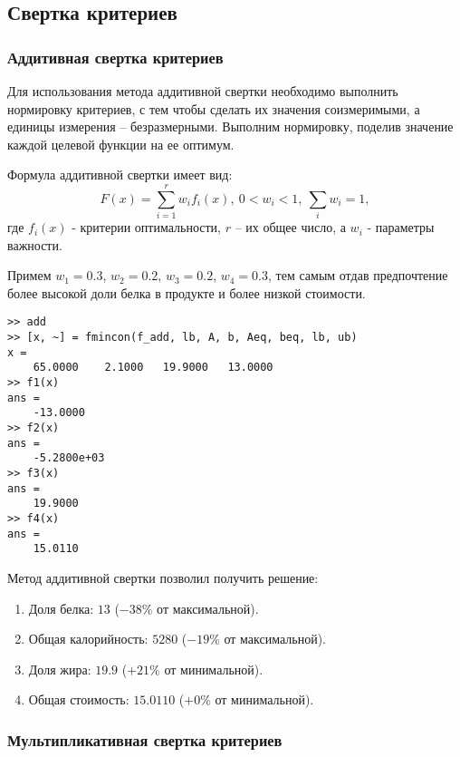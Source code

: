 \subsection{Свертка критериев}

\subsubsection{Аддитивная свертка критериев}

Для использования метода аддитивной свертки необходимо выполнить нормировку критериев, с тем чтобы сделать их значения соизмеримыми, а единицы измерения – безразмерными. Выполним нормировку, поделив значение каждой целевой функции на ее оптимум.

Формула аддитивной свертки имеет вид:
$$
F(x) = \sum_{i=1}^{r}w_i f_i(x),\ 0<w_i<1,\ \sum_i w_i=1,
$$
где $f_i(x)$ - критерии оптимальности, $r$ – их общее число, а $w_i$ - параметры важности. 

Примем $w_1 = 0.3$, $w_2 = 0.2$, $w_3 = 0.2$, $w_4 = 0.3$, тем самым отдав предпочтение более высокой доли белка в продукте и более низкой стоимости.





\begin{lstlisting}[caption=\code{Console}]
>> add
>> [x, ~] = fmincon(f_add, lb, A, b, Aeq, beq, lb, ub)
x = 
	65.0000    2.1000   19.9000   13.0000
>> f1(x)
ans =
	-13.0000
>> f2(x)
ans =
	-5.2800e+03
>> f3(x)
ans =
	19.9000
>> f4(x)
ans =
	15.0110
\end{lstlisting}

Метод аддитивной свертки позволил получить решение:

\begin{enumerate}
	\item Доля белка: $13$ ($-38\%$ от максимальной).
	\item Общая калорийность: $5280$ ($-19\%$ от максимальной).
	\item Доля жира: $19.9$ ($+21\%$ от минимальной).
	\item Общая стоимость: $15.0110$ ($+0\%$ от минимальной).
\end{enumerate}

\subsubsection{Мультипликативная свертка критериев}

